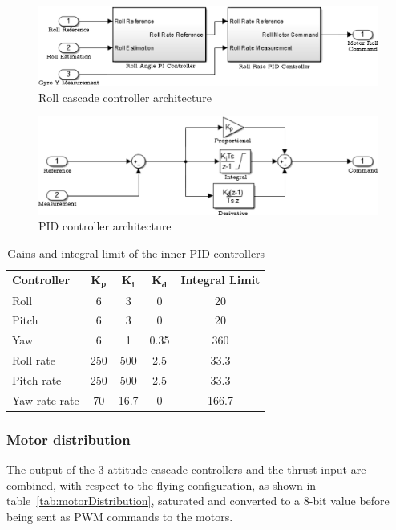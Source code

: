 \documentclass[a4paper, 12pt]{report}
\begin{document}
\begin{figure}[htbp]
\centering
\includegraphics[scale = 0.75]{Images/controllerCascade}
\caption{Roll cascade controller architecture}
\label{fig:controllerCascade}
\end{figure}

\begin{figure}[htbp]
\centering
\includegraphics[scale = 0.8]{Images/controllerPID}
\caption{PID controller architecture}
\label{fig:controllerPID}
\end{figure}

\begin{table}[htdp]
\caption{Gains and integral limit of the inner PID controllers}
\centering
\begin{tabular}{|l||c|c|c|c|}
\hline
\textbf{Controller} & $\boldsymbol{K_p}$ & $\boldsymbol{K_i}$ & $\boldsymbol{K_d}$ & \textbf{Integral Limit}  \\
\hhline{|=#=|=|=|=|}
Roll & 6 & 3 & 0 & 20  \\
\hline
Pitch & 6 & 3 & 0 & 20  \\
\hline
Yaw & 6 & 1 & 0.35 & 360  \\
\hline
Roll rate & 250 & 500 & 2.5 & 33.3  \\
\hline
Pitch rate & 250 & 500 & 2.5 & 33.3  \\
\hline
Yaw rate rate & 70 & 16.7 & 0 & 166.7  \\
\hline
\end{tabular}
\label{tab:controllerInnerGains}
\end{table}

\subsubsection{Motor distribution}
The output of the 3 attitude cascade controllers and the thrust input are combined, with respect to the flying configuration, as shown in table~\ref{tab:motorDistribution}, saturated and converted to a 8-bit value before being sent as PWM commands to the motors. 
\end{document}
